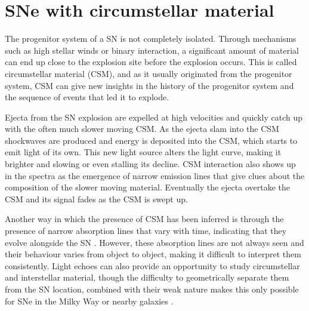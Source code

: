 \documentclass[a4paper,oneside,12pt, class=Latex/Classes/PhDthesisPSnPDF, crop=false]{standalone}
\begin{document}
\section{SNe with circumstellar material}
The progenitor system of a SN is not completely isolated. Through mechanisms such as high stellar winds or binary interaction, a significant amount of material can end up close to the explosion site before the explosion occurs. This is called circumstellar material (CSM), and as it usually originated from the progenitor system, CSM can give new insights in the history of the progenitor system and the sequence of events that led it to explode.

Ejecta from the SN explosion are expelled at high velocities and quickly catch up with the often much slower moving CSM. As the ejecta slam into the CSM shockwaves are produced and energy is deposited into the CSM, which starts to emit light of its own. This new light source alters the light curve, making it brighter and slowing or even stalling its decline. CSM interaction also shows up in the spectra as the emergence of narrow emission lines that give clues about the composition of the slower moving material. Eventually the ejecta overtake the CSM and its signal fades as the CSM is swept up.

Another way in which the presence of CSM has been inferred is through the presence of narrow absorption lines that vary with time, indicating that they evolve alongside the SN \citep[e.g.,][]{2006X, Sternberg_NaID}. However, these absorption lines are not always seen and their behaviour varies from object to object, making it difficult to interpret them consistently. Light echoes can also provide an opportunity to study circumstellar and interstellar material, though the difficulty to geometrically separate them from the SN location, combined with their weak nature makes this only possible for SNe in the Milky Way or nearby galaxies \citep{Patat_light_echoes, Tycho_Brahe_classif, 2012cg}.
\end{document}

